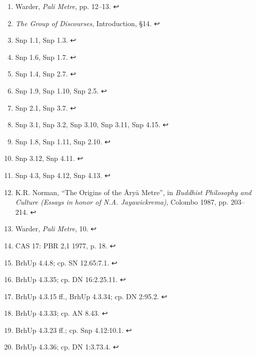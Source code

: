 \documentclass[12pt,openany]{book}%
\begin{document}
\begin{enumerate}%
\item Warder, \textit{Pali Metre}, pp. 12–13. ↩

%
\item \textit{The Group of Discourses}, Introduction, §14. ↩

%
\item Snp 1.1, Snp 1.3. ↩

%
\item Snp 1.6, Snp 1.7. ↩

%
\item Snp 1.4, Snp 2.7. ↩

%
\item Snp 1.9, Snp 1.10, Snp 2.5. ↩

%
\item Snp 2.1, Snp 3.7. ↩

%
\item Snp 3.1, Snp 3.2, Snp 3.10, Snp 3.11, Snp 4.15. ↩

%
\item Snp 1.8, Snp 1.11, Snp 2.10. ↩

%
\item Snp 3.12, Snp 4.11. ↩

%
\item Snp 4.3, Snp 4.12, Snp 4.13. ↩

%
\item K.R. Norman, “The Origins of the \textsanskrit{Āryā} Metre”, in \textit{Buddhist Philosophy and Culture (Essays in honor of N.A. Jayawickrema)}, Colombo 1987, pp. 203–214. ↩

%
\item Warder, \textit{Pali Metre}, 10. ↩

%
\item CAS 17: PBR 2,1 1977, p. 18. ↩

%
\item BrhUp 4.4.8; cp. SN 12.65:7.1. ↩

%
\item BrhUp 4.3.35; cp. DN 16:2.25.11. ↩

%
\item BrhUp 4.3.15 ff., BrhUp 4.3.34; cp. DN 2:95.2. ↩

%
\item BrhUp 4.3.33; cp. AN 8.43. ↩

%
\item BrhUp 4.3.23 ff.; cp. Snp 4.12:10.1. ↩

%
\item BrhUp 4.3.36; cp. DN 1:3.73.4. ↩


\end{enumerate}
\end{document}
